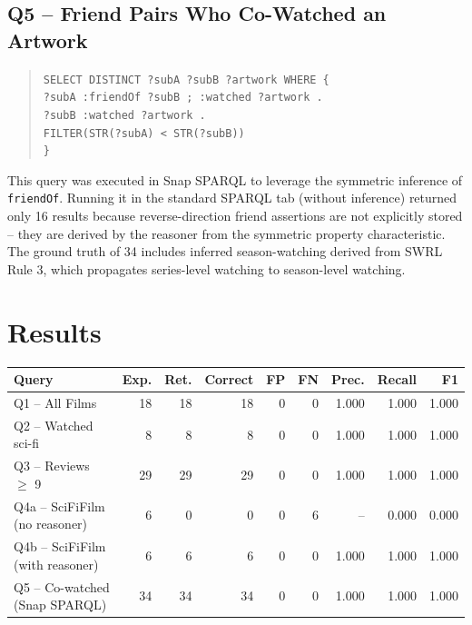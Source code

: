 \subsection*{Q5 -- Friend Pairs Who Co-Watched an Artwork}
\begin{quote}\small
\texttt{SELECT DISTINCT ?subA ?subB ?artwork WHERE \{}\\
\texttt{\phantom{xx}?subA :friendOf ?subB ; :watched ?artwork .}\\
\texttt{\phantom{xx}?subB :watched ?artwork .}\\
\texttt{\phantom{xx}FILTER(STR(?subA) < STR(?subB))}\\
\texttt{\}}
\end{quote}
This query was executed in Snap SPARQL to leverage the symmetric inference of \texttt{friendOf}. Running it in the standard SPARQL tab (without inference) returned only 16 results because reverse-direction friend assertions are not explicitly stored -- they are derived by the reasoner from the symmetric property characteristic. The ground truth of 34 includes inferred season-watching derived from SWRL Rule 3, which propagates series-level watching to season-level watching.

\section*{Results}

\begin{center}
\begin{tabular}{lrrrrrrrr}
\hline
\textbf{Query} & \textbf{Exp.} & \textbf{Ret.} & \textbf{Correct} & \textbf{FP} & \textbf{FN} & \textbf{Prec.} & \textbf{Recall} & \textbf{F1} \\
\hline
Q1 -- All Films & 18 & 18 & 18 & 0 & 0 & 1.000 & 1.000 & 1.000 \\
Q2 -- Watched sci-fi & 8 & 8 & 8 & 0 & 0 & 1.000 & 1.000 & 1.000 \\
Q3 -- Reviews $\geq$ 9 & 29 & 29 & 29 & 0 & 0 & 1.000 & 1.000 & 1.000 \\
Q4a -- SciFiFilm (no reasoner) & 6 & 0 & 0 & 0 & 6 & -- & 0.000 & 0.000 \\
Q4b -- SciFiFilm (with reasoner) & 6 & 6 & 6 & 0 & 0 & 1.000 & 1.000 & 1.000 \\
Q5 -- Co-watched (Snap SPARQL) & 34 & 34 & 34 & 0 & 0 & 1.000 & 1.000 & 1.000 \\
\hline
\end{tabular}
\end{center}

